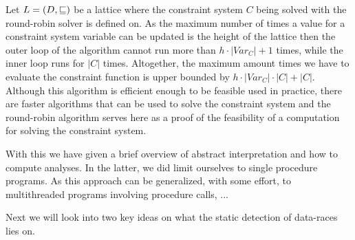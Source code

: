 \documentclass[..thesis.tex]{subfiles}
\begin{document}
Let $L = \left( D, \sqsubseteq \right)$ be a lattice where the constraint system $C$ being solved with the round-robin solver is defined on. As the maximum number of times a value for a constraint system variable can be updated is the height of the lattice then the outer loop of the algorithm cannot run more than $h \cdot \left| Var_C \right| + 1$ times, while the inner loop runs for $\left| C \right|$ times. Altogether, the maximum amount times we have to evaluate the constraint function is upper bounded by $h \cdot \left| Var_C \right| \cdot \left| C \right| + \left| C \right|$. Although this algorithm is efficient enough to be feasible used in practice, there are faster algorithms that can be used to solve the constraint system and the round-robin algorithm serves here as a proof of the feasibility of a computation for solving the constraint system.


With this we have given a brief overview of abstract interpretation and how to compute analyses. In the latter, we did limit ourselves to single procedure programs. As this approach can be generalized, with some effort, to multithreaded programs involving procedure calls, ...


Next we will look into two key ideas on what the static detection of data-races lies on.
\end{document}
